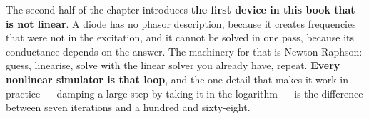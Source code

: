 The second half of the chapter introduces \textbf{the first device in this book that is not
linear}. A diode has no phasor description, because it creates frequencies that were not in the
excitation, and it cannot be solved in one pass, because its conductance depends on the answer. The
machinery for that is Newton-Raphson: guess, linearise, solve with the linear solver you already
have, repeat. \textbf{Every nonlinear simulator is that loop}, and the one detail that makes it
work in practice --- damping a large step by taking it in the logarithm --- is the difference
between seven iterations and a hundred and sixty-eight.





